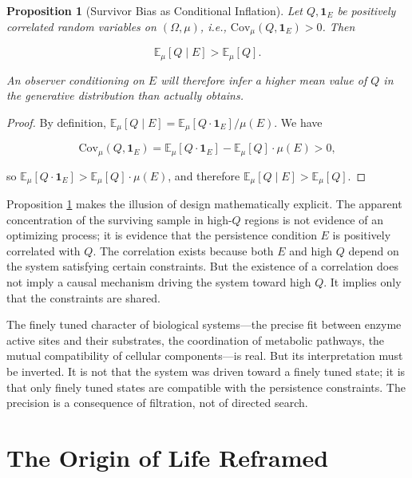 \documentclass[12pt, a4paper, oneside]{article}
\theoremstyle{plain}
\newtheorem{proposition}[theorem]{Proposition}
\theoremstyle{definition}
\theoremstyle{remark}
\begin{document}
\begin{proposition}[Survivor Bias as Conditional Inflation]
\label{prop:survivor-bias}
Let $Q, \mathbf{1}_E$ be positively correlated random variables on $(\Omega, \mu)$, i.e., $\mathrm{Cov}_\mu(Q, \mathbf{1}_E) > 0$. Then

\begin{equation}
\mathbb{E}_\mu[Q \mid E] > \mathbb{E}_\mu[Q].
\end{equation}

An observer conditioning on $E$ will therefore infer a higher mean value of $Q$ in the generative distribution than actually obtains.
\end{proposition}

\begin{proof}
By definition, $\mathbb{E}_\mu[Q \mid E] = \mathbb{E}_\mu[Q \cdot \mathbf{1}_E] / \mu(E)$. We have

\begin{equation}
\mathrm{Cov}_\mu(Q, \mathbf{1}_E) = \mathbb{E}_\mu[Q \cdot \mathbf{1}_E] - \mathbb{E}_\mu[Q] \cdot \mu(E) > 0,
\end{equation}

so $\mathbb{E}_\mu[Q \cdot \mathbf{1}_E] > \mathbb{E}_\mu[Q] \cdot \mu(E)$, and therefore $\mathbb{E}_\mu[Q \mid E] > \mathbb{E}_\mu[Q]$.
\end{proof}

Proposition \ref{prop:survivor-bias} makes the illusion of design mathematically explicit. The apparent concentration of the surviving sample in high-$Q$ regions is not evidence of an optimizing process; it is evidence that the persistence condition $E$ is positively correlated with $Q$. The correlation exists because both $E$ and high $Q$ depend on the system satisfying certain constraints. But the existence of a correlation does not imply a causal mechanism driving the system toward high $Q$. It implies only that the constraints are shared.

The finely tuned character of biological systems---the precise fit between enzyme active sites and their substrates, the coordination of metabolic pathways, the mutual compatibility of cellular components---is real. But its interpretation must be inverted. It is not that the system was driven toward a finely tuned state; it is that only finely tuned states are compatible with the persistence constraints. The precision is a consequence of filtration, not of directed search.

\section{The Origin of Life Reframed}
\end{document}
